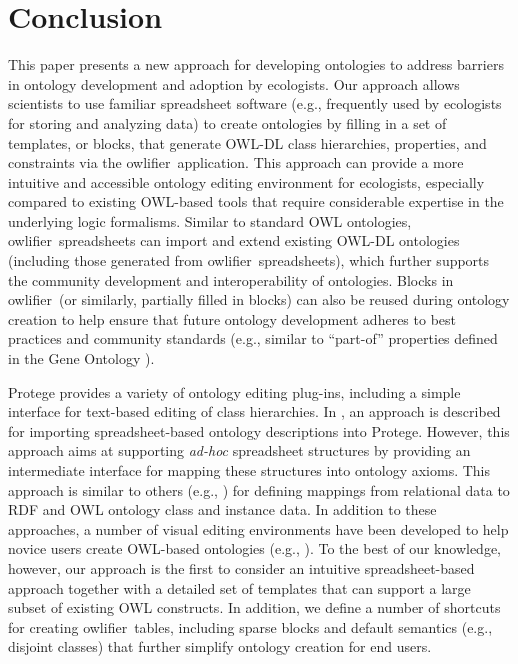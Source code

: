 \documentclass[5p,authoryear]{elsarticle}
\newcommand{\owlifier}{\textsf{owlifier}}
\begin{document}
\section{Conclusion}
\label{sec:conclusion}

This paper presents a new approach for developing ontologies to
address barriers in ontology development and adoption by
ecologists. Our approach allows scientists to use familiar spreadsheet
software (e.g., frequently used by ecologists for storing and
analyzing data) to create ontologies by filling in a set of templates,
or blocks, that generate OWL-DL class hierarchies, properties, and
constraints via the \owlifier\ application.  This approach can provide
a more intuitive and accessible ontology editing environment for
ecologists, especially compared to existing OWL-based tools that
require considerable expertise in the underlying logic
formalisms. Similar to standard OWL ontologies,
\owlifier\ spreadsheets can import and extend existing OWL-DL
ontologies (including those generated from \owlifier\ spreadsheets),
which further supports the community development and interoperability
of ontologies. Blocks in \owlifier\ (or similarly, partially filled in
blocks) can also be reused during ontology creation to help ensure
that future ontology development adheres to best practices and
community standards (e.g., similar to ``part-of'' properties defined
in the Gene Ontology
\citep{bada04:_short_study_succes_of_gene_ontol}).

Protege provides a variety of ontology editing plug-ins, including a
simple interface for text-based editing of class hierarchies. In
\citep{kola07:_impor_spread_data_into_proteg}, an approach is
described for importing spreadsheet-based ontology descriptions into
Protege. However, this approach aims at supporting \emph{ad-hoc}
spreadsheet structures by providing an intermediate interface for
mapping these structures into ontology axioms. This approach is
similar to others (e.g.,
\citep{han08:_rdf12,bizer03:_d2r_map,an06:_discov_seman_of_relat_tables_throug_mappin})
for defining mappings from relational data to RDF and OWL ontology
class and instance data. In addition to these approaches, a number of
visual editing environments have been developed to help novice users
create OWL-based ontologies (e.g.,
\citep{hayes05:_collab_knowl_captur_in_ontol}). To the best of our
knowledge, however, our approach is the first to consider an intuitive
spreadsheet-based approach together with a detailed set of templates
that can support a large subset of existing OWL constructs. In
addition, we define a number of shortcuts for creating
\owlifier\ tables, including sparse blocks and default semantics
(e.g., disjoint classes) that further simplify ontology creation for
end users.
\end{document}
